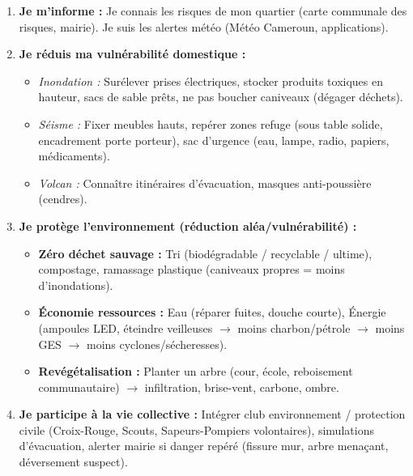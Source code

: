 \documentclass[11pt]{article}
\begin{document}
\begin{methode}
\begin{enumerate}
    \item \textbf{Je m'informe :} Je connais les risques de mon quartier (carte communale des risques, mairie). Je suis les alertes météo (Météo Cameroun, applications).
    \item \textbf{Je réduis ma vulnérabilité domestique :}
    \begin{itemize}
        \item \emph{Inondation :} Surélever prises électriques, stocker produits toxiques en hauteur, sacs de sable prêts, ne pas boucher caniveaux (dégager déchets).
        \item \emph{Séisme :} Fixer meubles hauts, repérer zones refuge (sous table solide, encadrement porte porteur), sac d'urgence (eau, lampe, radio, papiers, médicaments).
        \item \emph{Volcan :} Connaître itinéraires d'évacuation, masques anti-poussière (cendres).
    \end{itemize}
    \item \textbf{Je protège l'environnement (réduction aléa/vulnérabilité) :}
    \begin{itemize}
        \item \textbf{Zéro déchet sauvage :} Tri (biodégradable / recyclable / ultime), compostage, ramassage plastique (caniveaux propres = moins d'inondations).
        \item \textbf{Économie ressources :} Eau (réparer fuites, douche courte), Énergie (ampoules LED, éteindre veilleuses $\rightarrow$ moins charbon/pétrole $\rightarrow$ moins GES $\rightarrow$ moins cyclones/sécheresses).
        \item \textbf{Revégétalisation :} Planter un arbre (cour, école, reboisement communautaire) $\rightarrow$ infiltration, brise-vent, carbone, ombre.
    \end{itemize}
    \item \textbf{Je participe à la vie collective :} Intégrer club environnement / protection civile (Croix-Rouge, Scouts, Sapeurs-Pompiers volontaires), simulations d'évacuation, alerter mairie si danger repéré (fissure mur, arbre menaçant, déversement suspect).
\end{enumerate}
\end{methode}
\end{document}
